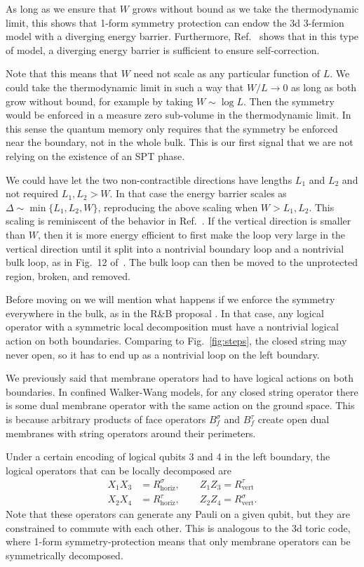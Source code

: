 \documentclass[twocolumn, longbibliography]{revtex4-2}
\newcommand{\nn}{\nonumber\\}
\renewcommand{\vert}{\text{vert}}
\newcommand{\horiz}{\text{horiz}}
\begin{document}
As long as we ensure that $W$ grows without bound as we take the thermodynamic limit, this shows that 1-form symmetry protection can endow the 3d 3-fermion model with a diverging energy barrier. Furthermore, Ref.~\cite{RobertsBartlett} shows that in this type of model, a diverging energy barrier is sufficient to ensure self-correction.

Note that this means that $W$ need not scale as any particular function of $L$. We could take the thermodynamic limit in such a way that $W/L\to 0$ as long as both grow without bound, for example by taking $W\sim \log L$. Then the symmetry would be enforced in a measure zero sub-volume in the thermodynamic limit. In this sense the quantum memory only requires that the symmetry be enforced near the boundary, not in the whole bulk. This is our first signal that we are not relying on the existence of an SPT phase.

We could have let the two non-contractible directions have lengths $L_1$ and $L_2$ and not required $L_1, L_2>W$. In that case the energy barrier scales as $\Delta\sim \min\{L_1,L_2,W\}$, reproducing the above scaling when $W>L_1,L_2$. 
This scaling is reminiscent of the behavior in Ref.~\cite{RobertsBartlett}. If the vertical direction is smaller than $W$, then it is more energy efficient to first make the loop very large in the vertical direction until it split into a nontrivial boundary loop and a nontrivial bulk loop, as in Fig.~12 of~\cite{RobertsBartlett}. The bulk loop can then be moved to the unprotected region, broken, and removed.

Before moving on we will mention what happens if we enforce the symmetry everywhere in the bulk, as in the R\&B proposal \cite{RobertsBartlett}. In that case, any logical operator with a symmetric local decomposition must have a nontrivial logical action on both boundaries. Comparing to Fig.~\ref{fig:steps}, the closed string may never open, so it has to end up as a nontrivial loop on the left boundary. 

We previously said that membrane operators had to have logical actions on both boundaries. In confined Walker-Wang models, for any closed string operator there is some dual membrane operator with the same action on the ground space. This is because arbitrary products of face operators $B_f^\sigma$ and $B_f^\tau$ create open dual membranes with string operators around their perimeters.

Under a certain encoding of logical qubits 3 and 4 in the left boundary, the logical operators that can be locally decomposed are 
\begin{align}
X_1X_3 &= R^\sigma_\horiz,\qquad Z_1Z_3 = R^\tau_\vert\nn
X_2X_4 &= R^\tau_\horiz, \qquad Z_2Z_4 = R^\sigma_\vert.
\label{eqn:fullenc}
\end{align}
Note that these operators can generate any Pauli on a given qubit, but they are constrained to commute with each other. This is analogous to the 3d toric code, where 1-form symmetry-protection means that only membrane operators can be symmetrically decomposed.
\end{document}
